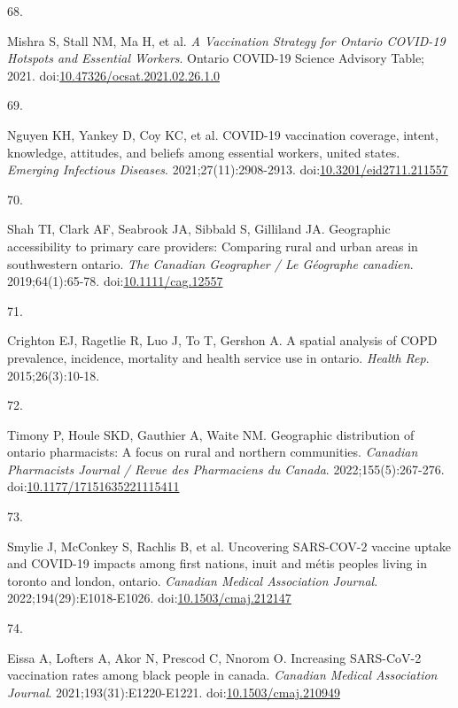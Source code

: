\documentclass[
]{article}
\newlength{\cslhangindent}
\newlength{\csllabelwidth}
\newlength{\cslentryspacingunit} %
\newenvironment{CSLReferences}[2] %
 {%
  \setlength{\parindent}{0pt}
  \ifodd #1
  \let\oldpar\par
  \def\par{\hangindent=\cslhangindent\oldpar}
  \fi
  \setlength{\parskip}{#2\cslentryspacingunit}
 }%
 {}
\newcommand{\CSLLeftMargin}[1]{\parbox[t]{\csllabelwidth}{#1}}
\newcommand{\CSLRightInline}[1]{\parbox[t]{\linewidth - \csllabelwidth}{#1}\break}
\begin{document}
\begin{CSLReferences}{0}{0}
\leavevmode{}%
\CSLLeftMargin{68. }%
\CSLRightInline{Mishra S, Stall NM, Ma H, et al. \emph{A Vaccination
Strategy for Ontario {COVID}-19 Hotspots and Essential Workers}. Ontario
{COVID}-19 Science Advisory Table; 2021.
doi:\href{https://doi.org/10.47326/ocsat.2021.02.26.1.0}{10.47326/ocsat.2021.02.26.1.0}}

\leavevmode{}%
\CSLLeftMargin{69. }%
\CSLRightInline{Nguyen KH, Yankey D, Coy KC, et al. {COVID}-19
vaccination coverage, intent, knowledge, attitudes, and beliefs among
essential workers, united states. \emph{Emerging Infectious Diseases}.
2021;27(11):2908-2913.
doi:\href{https://doi.org/10.3201/eid2711.211557}{10.3201/eid2711.211557}}

\leavevmode{}%
\CSLLeftMargin{70. }%
\CSLRightInline{Shah TI, Clark AF, Seabrook JA, Sibbald S, Gilliland JA.
Geographic accessibility to primary care providers: Comparing rural and
urban areas in southwestern ontario. \emph{The Canadian Geographer / Le
G{é}ographe canadien}. 2019;64(1):65-78.
doi:\href{https://doi.org/10.1111/cag.12557}{10.1111/cag.12557}}

\leavevmode{}%
\CSLLeftMargin{71. }%
\CSLRightInline{Crighton EJ, Ragetlie R, Luo J, To T, Gershon A. A
spatial analysis of {COPD} prevalence, incidence, mortality and health
service use in ontario. \emph{Health Rep}. 2015;26(3):10-18.}

\leavevmode{}%
\CSLLeftMargin{72. }%
\CSLRightInline{Timony P, Houle SKD, Gauthier A, Waite NM. Geographic
distribution of ontario pharmacists: A focus on rural and northern
communities. \emph{Canadian Pharmacists Journal / Revue des Pharmaciens
du Canada}. 2022;155(5):267-276.
doi:\href{https://doi.org/10.1177/17151635221115411}{10.1177/17151635221115411}}

\leavevmode{}%
\CSLLeftMargin{73. }%
\CSLRightInline{Smylie J, McConkey S, Rachlis B, et al. Uncovering
{SARS}-{COV}-2 vaccine uptake and {COVID}-19 impacts among first
nations, inuit and m{é}tis peoples living in toronto and london,
ontario. \emph{Canadian Medical Association Journal}.
2022;194(29):E1018-E1026.
doi:\href{https://doi.org/10.1503/cmaj.212147}{10.1503/cmaj.212147}}

\leavevmode{}%
\CSLLeftMargin{74. }%
\CSLRightInline{Eissa A, Lofters A, Akor N, Prescod C, Nnorom O.
Increasing {SARS}-{CoV}-2 vaccination rates among black people in
canada. \emph{Canadian Medical Association Journal}.
2021;193(31):E1220-E1221.
doi:\href{https://doi.org/10.1503/cmaj.210949}{10.1503/cmaj.210949}}


\end{CSLReferences}
\end{document}
